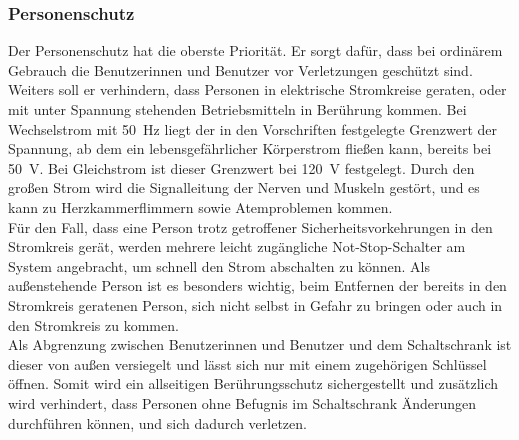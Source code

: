 \subsubsection{Personenschutz}\label{Personenschutz}
Der Personenschutz hat die oberste Priorität. Er sorgt dafür, dass bei ordinärem Gebrauch die Benutzerinnen und Benutzer vor Verletzungen geschützt sind. Weiters soll er verhindern, dass Personen in elektrische Stromkreise geraten, oder mit unter Spannung stehenden Betriebsmitteln in Berührung kommen. Bei Wechselstrom mit \qty{50}{\hertz} liegt der in den Vorschriften festgelegte Grenzwert der Spannung, ab dem ein lebensgefährlicher Körperstrom fließen kann, bereits bei \qty{50}{\volt}. Bei Gleichstrom ist dieser Grenzwert bei \qty{120}{\volt} festgelegt.\cite{SeyrRösch} Durch den großen Strom wird die Signalleitung der Nerven und Muskeln gestört, und es kann zu Herzkammerflimmern sowie Atemproblemen kommen.\cite{Gefahr_el_Strom}\\
Für den Fall, dass eine Person trotz getroffener Sicherheitsvorkehrungen in den Stromkreis gerät, werden mehrere leicht zugängliche Not-Stop-Schalter am System angebracht, um schnell den Strom abschalten zu können. Als außenstehende Person ist es besonders wichtig, beim Entfernen der bereits in den Stromkreis geratenen Person, sich nicht selbst in Gefahr zu bringen oder auch in den Stromkreis zu kommen.\\
Als Abgrenzung zwischen Benutzerinnen und Benutzer und dem Schaltschrank ist dieser von außen versiegelt und lässt sich nur mit einem zugehörigen Schlüssel öffnen. Somit wird ein allseitigen Berührungsschutz sichergestellt und zusätzlich wird verhindert, dass Personen ohne Befugnis im Schaltschrank Änderungen durchführen können, und sich dadurch verletzen.

